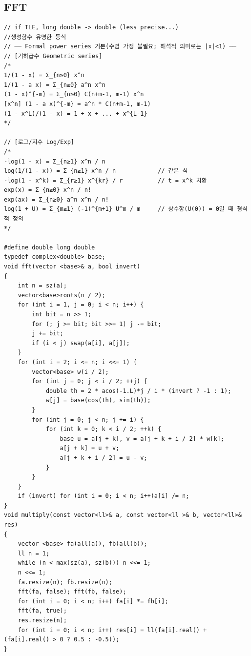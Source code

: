 \documentclass[landscape, 8pt, a4paper, oneside, twocolumn]{extarticle}
\begin{document}
\subsection{FFT}
\begin{verbatim}
// if TLE, long double -> double (less precise...)
//생성함수 유명한 등식
// ── Formal power series 기본(수렴 가정 불필요; 해석적 의미로는 |x|<1) ──
// [기하급수 Geometric series]
/*
1/(1 - x) = Σ_{n≥0} x^n
1/(1 - a x) = Σ_{n≥0} a^n x^n
(1 - x)^{-m} = Σ_{n≥0} C(n+m-1, m-1) x^n
[x^n] (1 - a x)^{-m} = a^n * C(n+m-1, m-1)
(1 - x^L)/(1 - x) = 1 + x + ... + x^{L-1}
*/

// [로그/지수 Log/Exp]
/*
-log(1 - x) = Σ_{n≥1} x^n / n
log(1/(1 - x)) = Σ_{n≥1} x^n / n            // 같은 식
-log(1 - x^k) = Σ_{r≥1} x^{kr} / r          // t = x^k 치환
exp(x) = Σ_{n≥0} x^n / n!
exp(ax) = Σ_{n≥0} a^n x^n / n!
log(1 + U) = Σ_{m≥1} (-1)^{m+1} U^m / m     // 상수항(U(0)) = 0일 때 형식적 정의
*/

#define double long double 
typedef complex<double> base;
void fft(vector <base>& a, bool invert)
{
	int n = sz(a);
	vector<base>roots(n / 2);
	for (int i = 1, j = 0; i < n; i++) {
		int bit = n >> 1;
		for (; j >= bit; bit >>= 1) j -= bit;
		j += bit;
		if (i < j) swap(a[i], a[j]);
	}
	for (int i = 2; i <= n; i <<= 1) {
		vector<base> w(i / 2);
		for (int j = 0; j < i / 2; ++j) {
			double th = 2 * acos(-1.L)*j / i * (invert ? -1 : 1);
			w[j] = base(cos(th), sin(th));
		}
		for (int j = 0; j < n; j += i) {
			for (int k = 0; k < i / 2; ++k) {
				base u = a[j + k], v = a[j + k + i / 2] * w[k];
				a[j + k] = u + v;
				a[j + k + i / 2] = u - v;
			}
		}
	}
	if (invert)	for (int i = 0; i < n; i++)a[i] /= n;
}
void multiply(const vector<ll>& a, const vector<ll >& b, vector<ll>& res)
{
	vector <base> fa(all(a)), fb(all(b));
	ll n = 1;
	while (n < max(sz(a), sz(b))) n <<= 1;
	n <<= 1;
	fa.resize(n); fb.resize(n);
	fft(fa, false); fft(fb, false);
	for (int i = 0; i < n; i++) fa[i] *= fb[i];
	fft(fa, true);
	res.resize(n);
	for (int i = 0; i < n; i++) res[i] = ll(fa[i].real() + (fa[i].real() > 0 ? 0.5 : -0.5));
}
\end{verbatim}
\end{document}
